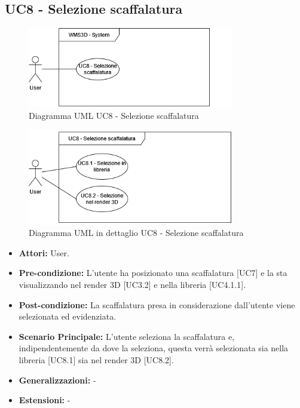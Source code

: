 \subsection{UC8 - Selezione scaffalatura}
\begin{figure}[H]
  \centering
  \includegraphics[width=0.8\textwidth]{UC_diagrams_1-10/UC8_sys.drawio.png}
   \caption{Diagramma UML UC8 - Selezione scaffalatura}
\end{figure}
\begin{figure}[H]
  \centering
  \includegraphics[width=0.8\textwidth]{UC_diagrams_1-10/UC8.drawio.png}
   \caption{Diagramma UML in dettaglio UC8 - Selezione scaffalatura}
\end{figure}
\begin{itemize}
    \item \textbf{Attori:} User.
    \item \textbf{Pre-condizione:}  L'utente ha posizionato una scaffalatura [UC7] e la sta visualizzando nel render 3D [UC3.2] e nella libreria [UC4.1.1].
    \item \textbf{Post-condizione:} La scaffalatura presa in considerazione dall'utente viene selezionata ed evidenziata.
    \item \textbf{Scenario Principale:} L'utente seleziona la scaffalatura e, indipendentemente da dove la seleziona, questa verrà selezionata sia nella libreria [UC8.1] sia nel render 3D [UC8.2].
    \item \textbf{Generalizzazioni:} -
    \item \textbf{Estensioni:} -
\end{itemize}


